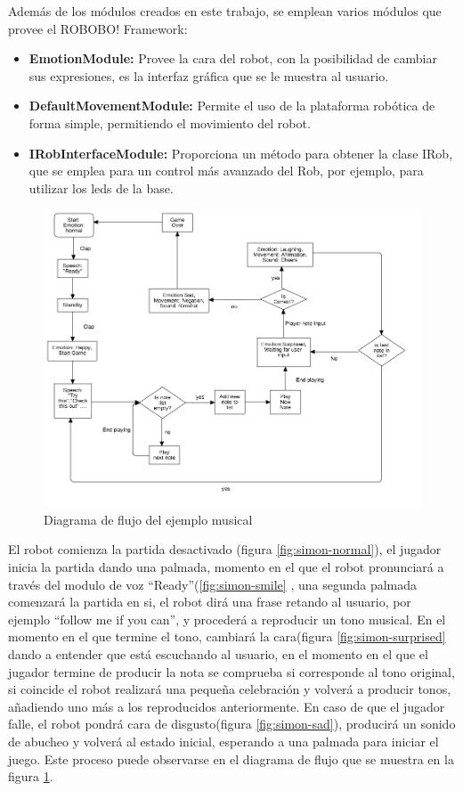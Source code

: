 Además de los módulos creados en este trabajo, se emplean varios módulos que provee el ROBOBO! Framework:

\begin{itemize}
	\item \textbf{EmotionModule:} Provee la cara del robot, con la posibilidad de cambiar sus expresiones, es la interfaz gráfica que se le muestra al usuario.
	\item \textbf{DefaultMovementModule:} Permite el uso de la plataforma robótica de forma simple, permitiendo el movimiento del robot.
	\item \textbf{IRobInterfaceModule:} Proporciona un método para obtener la clase IRob, que se emplea para un control más avanzado del Rob, por ejemplo, para utilizar los leds de la base.
\end{itemize}


\begin{figure}
	\centering
	\includegraphics[width=1.1\linewidth]{imagenes/simon_flowchart.png}
	\caption{Diagrama de flujo del ejemplo musical}
	\label{fig:simon-flowchart}
\end{figure} 


El robot comienza la partida desactivado (figura \ref{fig:simon-normal}), el jugador inicia la partida dando una palmada, momento en el que el robot pronunciará a través del modulo de voz \enquote{Ready}(\ref{fig:simon-smile} , una segunda palmada comenzará la partida en si, el robot dirá una frase retando al usuario, por ejemplo \enquote{follow me if you can}, y procederá a reproducir un tono musical. En el momento en el que termine el tono, cambiará la cara(figura \ref{fig:simon-surprised} dando a entender que está escuchando al usuario, en el momento en el que el jugador termine de producir la nota se comprueba si corresponde al tono original, si coincide el robot realizará una pequeña celebración y volverá a producir tonos, añadiendo uno más a los reproducidos anteriormente. En caso de que el jugador falle, el robot pondrá cara de disgusto(figura \ref{fig:simon-sad}), producirá un sonido de abucheo y volverá al estado inicial, esperando a una palmada para iniciar el juego. Este proceso puede observarse en el diagrama de flujo que se muestra en la figura \ref{fig:simon-flowchart}.

